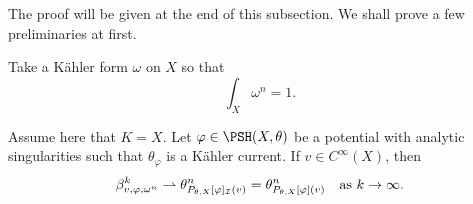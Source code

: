 The proof will be given at the end of this subsection. We shall prove a few preliminaries at first.



Take a K\"ahler form $\omega$ on $X$ so that
\[
\int_X \omega^n = 1.
\]
\begin{proposition}\label{prop:smooth_weak_conv}
    Assume here that $K=X$.
    Let $\varphi \in \PSH(X,\theta)$ be a potential with analytic singularities such that $\theta_{\varphi}$ is a Kähler current. If $v \in C^\infty(X)$, then
\begin{equation}\label{eq:pbmconvanaly}
\beta^k_{v,\varphi,\omega^n} \rightharpoonup \theta_{P_{\theta,X}[\varphi]_{\mathcal{I}}(v)}^n=\theta_{P_{\theta,X}[\varphi](v)}^n\quad \textup{as }k\to\infty.
\end{equation}
\end{proposition}

